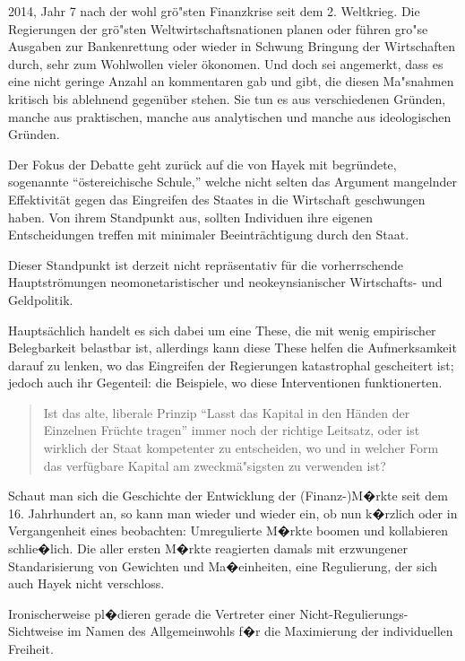 \documentclass[
    onecolumn,
    a4paper,
    abstracton,
    parskip=half
    ,final
    ]{scrartcl}
\begin{document}
2014, Jahr 7 nach der wohl gr{\"o}{"s}ten Finanzkrise seit dem 2. Weltkrieg. Die Regierungen der gr{\"o}{"s}ten Weltwirtschaftsnationen planen oder f{\"u}hren gro{"s}e Ausgaben zur Bankenrettung oder wieder in Schwung Bringung der Wirtschaften durch, sehr zum Wohlwollen vieler {\"o}konomen. Und doch sei angemerkt, dass es eine nicht geringe Anzahl an kommentaren gab und gibt, die diesen Ma{"s}nahmen kritisch bis ablehnend gegen{\"u}ber stehen. Sie tun es aus verschiedenen Gr{\"u}nden, manche aus praktischen, manche aus analytischen und manche aus ideologischen Gr{\"u}nden.

Der Fokus der Debatte geht zur{\"u}ck auf die von Hayek mit begr{\"u}ndete, sogenannte "`{\"o}stereichische Schule,"' welche nicht selten das Argument mangelnder Effektivit{\"a}t gegen das Eingreifen des Staates in die Wirtschaft geschwungen haben. Von ihrem Standpunkt aus, sollten Individuen ihre eigenen Entscheidungen treffen mit minimaler Beeintr{\"a}chtigung durch den Staat.

Dieser Standpunkt ist derzeit nicht repr{\"a}sentativ f{\"u}r die vorherrschende Hauptstr{\"o}mungen neomonetaristischer und neokeynsianischer Wirtschafts- und Geldpolitik.

Haupts{\"a}chlich handelt es sich dabei um eine These, die mit wenig empirischer Belegbarkeit belastbar ist, allerdings kann diese These helfen die Aufmerksamkeit darauf zu lenken, wo das Eingreifen der Regierungen katastrophal gescheitert ist; jedoch auch ihr Gegenteil: die Beispiele, wo diese Interventionen funktionerten.

\begin{quote}
Ist das alte, liberale Prinzip "`Lasst das Kapital in den H{\"a}nden der Einzelnen Fr{\"u}chte tragen"' immer noch der richtige Leitsatz,
 oder ist wirklich der Staat kompetenter zu entscheiden, wo und in welcher Form das verf{\"u}gbare Kapital am zweckm{\"a}{"s}igsten zu verwenden ist? \citep[S.23f]{Hayek1969}
\end{quote}

Schaut man sich die Geschichte der Entwicklung der (Finanz-)M�rkte seit dem 16. Jahrhundert an, so kann man wieder und wieder ein, ob nun k�rzlich oder in Vergangenheit eines beobachten: Umregulierte M�rkte boomen und kollabieren schlie�lich. Die aller ersten M�rkte reagierten damals mit erzwungener Standarisierung von Gewichten und Ma�einheiten, eine Regulierung, der sich auch Hayek nicht verschloss.

Ironischerweise pl�dieren gerade die Vertreter einer Nicht-Regulierungs-Sichtweise im Namen des Allgemeinwohls f�r die Maximierung der individuellen Freiheit.
\end{document}
